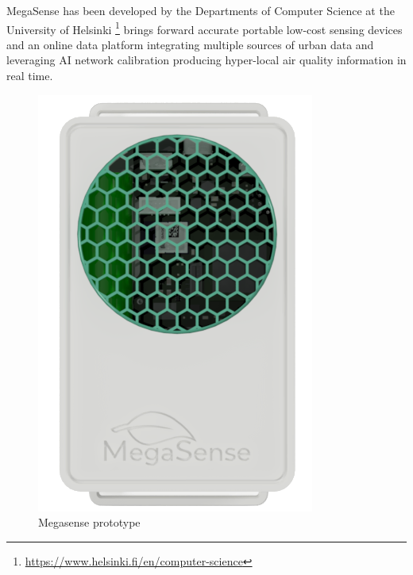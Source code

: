 		
			MegaSense has been developed by the Departments of Computer Science at the University of Helsinki \footnote{\url{https://www.helsinki.fi/en/computer-science}} brings forward accurate portable low-cost sensing devices and an online data platform integrating multiple sources of urban data and leveraging AI network calibration producing hyper-local air quality information in real time.
				
			\noindent
			\begin{minipage}{0.35\textwidth}
				\begin{figure}[H]
					\centering
					\includegraphics[width=.8\textwidth]{resources/img/megasense}
					\caption{Megasense prototype}
					\label{img:megasense_picture}
				\end{figure}
				\vspace{3mm}
			\end{minipage}%
			\hfill%
